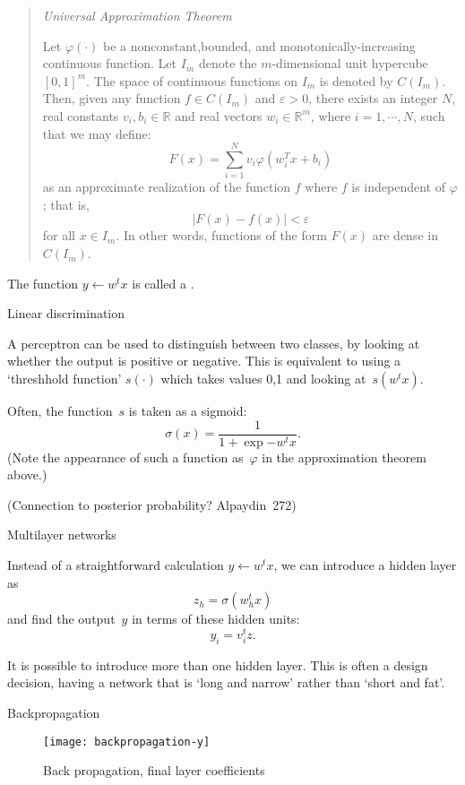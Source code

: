 \begin{quotation}
  \textsl{Universal Approximation Theorem}%

  Let $\varphi(\cdot)$ be a nonconstant,bounded, and
  monotonically-increasing continuous function. Let $I_m$ denote the
  $m$-dimensional unit hypercube $[0,1]^m$. The space
  of continuous functions on $I_m$ is denoted by
  $C(I_m)$. Then, given any function $f\in C(I_m)$
  and $\varepsilon>0$, there exists an integer
  $N$, real constants $v_i,b_i\in\mathbb{R}$ and
  real vectors $w_i \in \mathbb{R}^m$, where
  $i=1,\cdots,N$, such that we may define:
  \[
  F( x ) =
  \sum_{i=1}^{N} v_i \varphi \left( w_i^T x + b_i\right)
  \]
  as an approximate realization of the function $f$ where
  $f$ is independent of $\varphi$; that is,
  \[
  | F( x ) - f ( x ) | < \varepsilon
  \]
  for all $x\in I_m$. In other words, functions of the form
  $F(x)$ are dense in $C(I_m)$.
\end{quotation}

The function $y\leftarrow w^tx$ is called a .

 {Linear discrimination}

A perceptron can be used to distinguish between two classes, by
looking at whether the output is positive or negative. This is
equivalent to using a `threshhold function' $s(\cdot)$ which takes
values 0,1 and looking at~$s(w^tx)$.

Often, the function~$s$ is taken as a sigmoid:
\[ \sigma(x) = \frac1{1+\exp{-w^tx}}. \]
(Note the appearance of such a function as~$\varphi$ in the approximation theorem
above.)

(Connection to posterior probability? Alpaydin~272)

 {Multilayer networks}

Instead of a straightforward calculation $y\leftarrow w^tx$,
we can introduce a hidden layer as
\[ z_h = \sigma(w_h^tx) \]
and find the output~$y$ in terms of these hidden units:
\[ y_i = v_i^tz. \]

It is possible to introduce more than one hidden layer. This is often
a design decision, having a network that is `long and narrow' rather
than `short and fat'.

 {Backpropagation}

\begin{figure}[ht]
  \texttt{[image: backpropagation-y]}
  \caption{Back propagation, final layer coefficients}
  \label{fig:backprop-y}
\end{figure}


